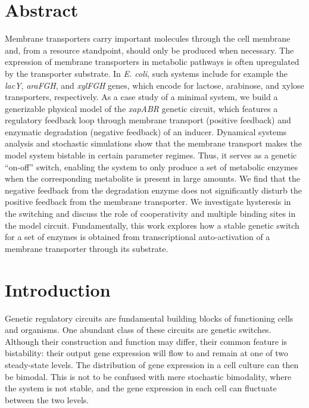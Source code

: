 \documentclass[10pt,letterpaper]{article}
\begin{document}
	\section*{Abstract}
	Membrane transporters carry important molecules through the cell membrane
	and, from a resource standpoint, should only be produced when necessary. The
	expression of membrane transporters in metabolic pathways is often
	upregulated by the transporter substrate. In \emph{E. coli}, such systems
	include for example the \emph{lacY}, \emph{araFGH}, and \emph{xylFGH} genes,
	which encode for lactose, arabinose, and xylose transporters, respectively.
	As a case study of a minimal system, we build a generizable physical model of the \emph{xapABR} genetic
	circuit, which features a regulatory feedback loop through membrane
	transport (positive feedback) and enzymatic degradation (negative feedback)
	of an inducer. Dynamical systems analysis and stochastic simulations show
	that the membrane transport makes the model system bistable in certain
	parameter regimes. Thus, it serves as a genetic “on-off” switch, enabling
	the system to only produce a set of metabolic enzymes when the corresponding
	metabolite is present in large amounts. We find that the negative feedback
	from the degradation enzyme does not significantly disturb the positive
	feedback from the membrane transporter. We investigate hysteresis in the
	switching and discuss the role of cooperativity and multiple binding sites
	in the model circuit. Fundamentally, this work explores how a stable genetic
	switch for a set of enzymes is obtained from transcriptional auto-activation
	of a membrane transporter through its substrate.
	
	\linenumbers
	
	
	\section*{Introduction} 
	Genetic regulatory circuits are fundamental building blocks of functioning
	cells and organisms. One abundant class of these circuits are genetic
	switches. Although their construction and function may differ,
	their common feature is bistability: their output gene expression
	will flow to and remain at one of two steady-state levels.
	The distribution of
	gene expression in a cell culture can then be bimodal. This is not to be
	confused with mere stochastic bimodality, where the system is not stable,
	and the gene expression in each cell can fluctuate between the two levels.
	
\end{document}
